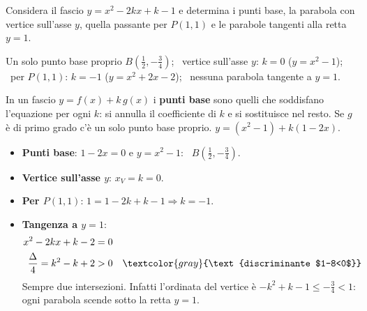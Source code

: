 \begin{question}[ID=5.4, subtitle={Fascio $y=x^2-2kx+k-1$: variante con vertice sull'asse $y$}, difficulty=difficile, tags={parabola, fasci}]
Considera il fascio $y=x^2-2kx+k-1$ e determina i punti base, la parabola con vertice sull'asse $y$, quella passante per $P(1,1)$ e le parabole tangenti alla retta $y=1$.
\begin{solution}
Un solo punto base proprio $B\left(\tfrac12,-\tfrac34\right)$; \ vertice sull'asse $y$: $k=0$ ($y=x^2-1$); \ per $P(1,1)$: $k=-1$ ($y=x^2+2x-2$); \ nessuna parabola tangente a $y=1$.
\end{solution}
\begin{explanation}
In un fascio $y=f(x)+k\,g(x)$ i \textbf{punti base} sono quelli che soddisfano l'equazione per ogni $k$: si annulla il coefficiente di $k$ e si sostituisce nel resto. Se $g$ è di primo grado c'è un solo punto base proprio.
$y=(x^2-1)+k(1-2x)$.
\begin{itemize}
    \item \textbf{Punti base}: $1-2x=0$ e $y=x^2-1$: \ $B\left(\tfrac12,-\tfrac34\right)$.
    \item \textbf{Vertice sull'asse $y$}: $x_V=k=0$.
    \item \textbf{Per $P(1,1)$}: $1=1-2k+k-1 \Rightarrow k=-1$.
    \item \textbf{Tangenza a $y=1$}:
    \[\begin{aligned}
    x^2-2kx+k-2 &= 0\\
    \dfrac\Delta4=k^2-k+2 &> 0 && \textcolor{gray}{\text{discriminante $1-8<0$}}
    \end{aligned}\]
    Sempre due intersezioni. Infatti l'ordinata del vertice è $-k^2+k-1\leq-\tfrac34<1$: ogni parabola scende sotto la retta $y=1$.
\end{itemize}
\end{explanation}
\end{question}


